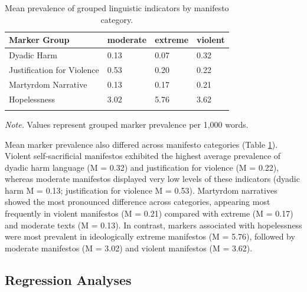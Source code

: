 \documentclass[
  english,
  man,floatsintext]{apa6}
\begin{document}
\begin{table}[tbp]

\begin{center}
\begin{threeparttable}

\caption{\label{tab:manifesto-descriptives}Mean prevalence of grouped linguistic indicators by manifesto category.}

\begin{tabular}{llll}
\toprule
Marker Group & \multicolumn{1}{c}{moderate} & \multicolumn{1}{c}{extreme} & \multicolumn{1}{c}{violent}\\
\midrule
Dyadic Harm & 0.13 & 0.07 & 0.32\\
Justification for Violence & 0.53 & 0.20 & 0.22\\
Martyrdom Narrative & 0.13 & 0.17 & 0.21\\
Hopelessness & 3.02 & 5.76 & 3.62\\
\bottomrule
\addlinespace
\end{tabular}

\begin{tablenotes}[para]
\normalsize{\textit{Note.} Values represent grouped marker prevalence per 1,000 words.}
\end{tablenotes}

\end{threeparttable}
\end{center}

\end{table}

Mean marker prevalence also differed across manifesto categories (Table \ref{tab:manifesto-descriptives}). Violent self-sacrificial manifestos exhibited the highest average prevalence of dyadic harm language (M = 0.32) and justification for violence (M = 0.22), whereas moderate manifestos displayed very low levels of these indicators (dyadic harm M = 0.13; justification for violence M = 0.53). Martyrdom narratives showed the most pronounced difference across categories, appearing most frequently in violent manifestos (M = 0.21) compared with extreme (M = 0.17) and moderate texts (M = 0.13). In contrast, markers associated with hopelessness were most prevalent in ideologically extreme manifestos (M = 5.76), followed by moderate manifestos (M = 3.02) and violent manifestos (M = 3.62).

\subsection{Regression Analyses}\label{regression-analyses}
\end{document}
